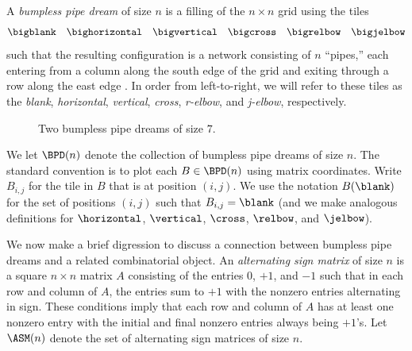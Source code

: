 A \textit{bumpless pipe dream} of size $n$ is a filling of the $n\times n$ grid using the tiles \[
    \bigblank\quad
    \bighorizontal\quad
    \bigvertical\quad
    \bigcross\quad
    \bigrelbow\quad
    \bigjelbow
\] such that the resulting configuration is a network consisting of $n$ ``pipes,'' each entering from a column along the south edge of the grid and exiting through a row along the east edge \cite{LLS21, Wei21}.
In order from left-to-right, we will refer to these tiles as the \textit{blank}, \textit{horizontal}, \textit{vertical}, \textit{cross}, \textit{r-elbow}, and \textit{j-elbow}, respectively.

\begin{figure}[ht]
    
    \caption{Two bumpless pipe dreams of size $7$.}
    \label{fig:bpd}
\end{figure}

We let $\BPD(n)$ denote the collection of bumpless pipe dreams of size $n$.
The standard convention is to plot each $B\in \BPD(n)$ using matrix coordinates.
Write $B_{i,j}$ for the tile in $B$ that is at position $(i,j)$.
We use the notation $B(\blank)$ for the set of positions $(i,j)$ such that $B_{i,j} = \blank$
(and we make analogous definitions for $\horizontal$, $\vertical$, $\cross$, $\relbow$, and $\jelbow$).

We now make a brief digression to discuss a connection between bumpless pipe dreams and a related combinatorial object.
An \textit{alternating sign matrix} of size $n$ is a square $n\times n$ matrix $A$ consisting of the entries $0$, $+1$, and $-1$ such that in each row and column of $A$, the entries sum to $+1$ with the nonzero entries alternating in sign.
These conditions imply that each row and column of $A$ has at least one nonzero entry with the initial and final nonzero entries always being $+1$'s.
Let $\ASM(n)$ denote the set of alternating sign matrices of size $n$.

